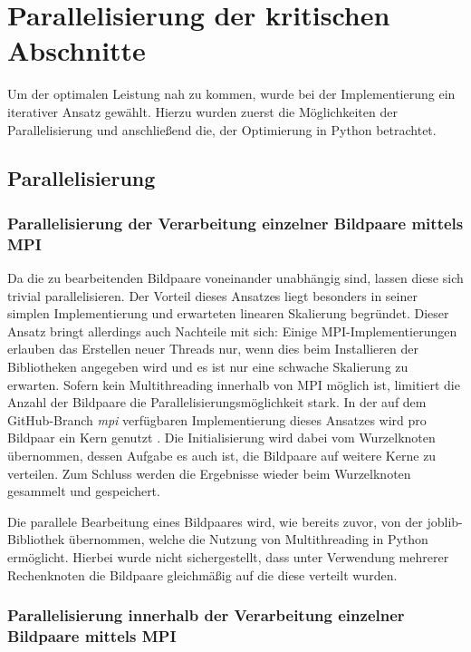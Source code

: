 \chapter{Parallelisierung der kritischen Abschnitte}

Um der optimalen Leistung nah zu kommen, wurde bei der Implementierung ein iterativer Ansatz gewählt. Hierzu wurden zuerst die Möglichkeiten der Parallelisierung und anschließend die, der Optimierung in Python betrachtet. 

\section{Parallelisierung}

\subsection{Parallelisierung der Verarbeitung einzelner Bildpaare mittels MPI}

Da die zu bearbeitenden Bildpaare voneinander unabhängig sind, lassen diese sich trivial parallelisieren. Der Vorteil dieses Ansatzes liegt besonders in seiner simplen Implementierung und erwarteten linearen Skalierung begründet. Dieser Ansatz bringt allerdings auch Nachteile mit sich: Einige \gls{MPI}-Implementierungen erlauben das Erstellen neuer Threads nur, wenn dies beim Installieren der Bibliotheken angegeben wird \cite{OMPI17} und es ist nur eine schwache Skalierung zu erwarten. Sofern kein Multithreading innerhalb von \gls{MPI} möglich ist, limitiert die Anzahl der Bildpaare die Parallelisierungsmöglichkeit stark. In der auf dem GitHub-Branch \textit{mpi} verfügbaren Implementierung dieses Ansatzes wird pro Bildpaar ein Kern genutzt \cite{Coj17}. Die Initialisierung wird dabei vom Wurzelknoten übernommen, dessen Aufgabe es auch ist, die Bildpaare auf weitere Kerne zu verteilen. Zum Schluss werden die Ergebnisse wieder beim Wurzelknoten gesammelt und gespeichert.

Die parallele Bearbeitung eines Bildpaares wird, wie bereits zuvor, von der joblib-Bibliothek übernommen, welche die Nutzung von Multithreading in Python ermöglicht. Hierbei wurde nicht sichergestellt, dass unter Verwendung mehrerer Rechenknoten die Bildpaare gleichmäßig auf die diese verteilt wurden. 

\subsection{Parallelisierung innerhalb der Verarbeitung einzelner Bildpaare mittels MPI}

